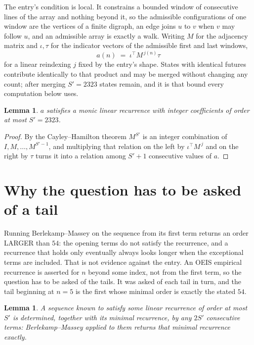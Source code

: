 \documentclass[11pt,a4paper]{article}
\theoremstyle{plain}
\newtheorem{lemma}[theorem]{Lemma}
\theoremstyle{definition}
\begin{document}
The entry's condition is local. It constrains a bounded window of consecutive lines of the
array and nothing beyond it, so the admissible configurations of one window are the vertices of
a finite digraph, an edge joins $u$ to $v$ when $v$ may follow $u$, and an admissible array is
exactly a walk. Writing $M$ for the adjacency matrix and $\iota,\tau$ for the indicator vectors
of the admissible first and last windows,
\[
a(n)\;=\;\iota^{\!\top}M^{\,j(n)}\tau
\]
for a linear reindexing $j$ fixed by the entry's shape. States with identical futures
contribute identically to that product and may be merged without changing any count; after
merging $S'=2323$ states remain, and it is that bound every computation below uses.

\begin{lemma}\label{lem:cf}
$a$ satisfies a monic linear recurrence with integer coefficients of order at most $S'=2323$.
\end{lemma}

\begin{proof}
By the Cayley--Hamilton theorem $M^{S'}$ is an integer combination of $I,M,\dots,M^{S'-1}$,
and multiplying that relation on the left by $\iota^{\!\top}M^{\,j}$ and on the right by
$\tau$ turns it into a relation among $S'+1$ consecutive values of $a$.
\end{proof}

\section{Why the question has to be asked of a tail}

Running Berlekamp--Massey on the sequence from its first term returns an order LARGER than $54$: the opening terms do not satisfy the recurrence, and a recurrence that holds only eventually always looks longer when the exceptional terms are included. That is not evidence against the entry. An OEIS empirical recurrence is asserted for $n$ beyond some index, not from the first term, so the question has to be asked of the tails. It was asked of each tail in turn, and the tail beginning at $n=5$ is the first whose minimal order is exactly the stated $54$.

\begin{lemma}\label{lem:bm}
A sequence known to satisfy some linear recurrence of order at most $S'$ is determined,
together with its minimal recurrence, by any $2S'$ consecutive terms: Berlekamp--Massey applied
to them returns that minimal recurrence exactly.
\end{lemma}
\end{document}
